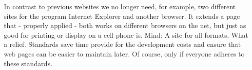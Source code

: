 In contrast to previous websites we no longer need, for example, two different sites for the program Internet Explorer and another browser. It extends a page that - properly applied - both works on different browsers on the net, but just as good for printing or display on a cell phone is. Mind: A site for all formats. What a relief. Standards save time provide for the development costs and ensure that web pages can be easier to maintain later. Of course, only if everyone adheres to these standards.
